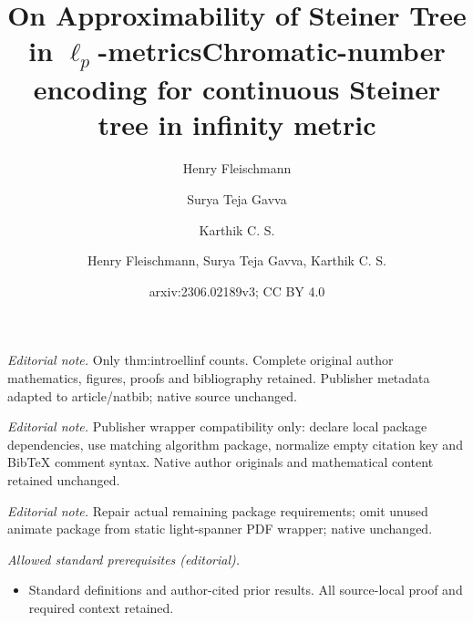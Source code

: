\documentclass{article}\providecommand{\DeclareRedundantLanguages}[2]{}\usepackage[a4paper,margin=20mm]{geometry}
\title{On Approximability of Steiner Tree in \texorpdfstring{$\ell_p$}{lp}-metrics}
\author{Henry Fleischmann \and Surya Teja Gavva \and Karthik C. S.}\date{}
\title{Chromatic-number encoding for continuous Steiner tree in infinity metric}
\author{Henry Fleischmann, Surya Teja Gavva, Karthik C. S.}
\date{arxiv:2306.02189v3; CC BY 4.0}
\newcommand{\1}{\textbf{1}}
\begin{document}
\maketitle
\noindent\textit{Editorial note.} Only thm:introellinf counts. Complete original author mathematics, figures, proofs and bibliography retained. Publisher metadata adapted to article/natbib; native source unchanged.\par\medskip
\noindent\textit{Editorial note.} Publisher wrapper compatibility only: declare local package dependencies, use matching algorithm package, normalize empty citation key and BibTeX comment syntax. Native author originals and mathematical content retained unchanged.\par\medskip
\noindent\textit{Editorial note.} Repair actual remaining package requirements; omit unused animate package from static light-spanner PDF wrapper; native unchanged.\par\medskip
\noindent\textit{Allowed standard prerequisites (editorial).}\begin{itemize}
\item Standard definitions and author-cited prior results. All source-local proof and required context retained.
\end{itemize}\medskip
\maketitle
\end{document}
